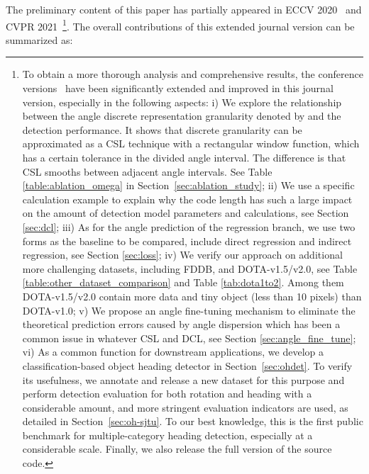 \documentclass[10pt,journal,compsoc]{IEEEtran}
\begin{document}
The preliminary content of this paper has partially appeared in ECCV 2020~\cite{yang2020arbitrary} and CVPR 2021~\cite{yang2021dense}\footnote{To obtain a more thorough analysis and comprehensive results, the conference versions~\cite{yang2020arbitrary, yang2021dense} have been significantly extended and improved in this journal version, especially in the following aspects: 
i) We explore the relationship between the angle discrete representation granularity denoted by  and the detection performance. It shows that discrete granularity  can be approximated as a CSL technique with a rectangular window function, which has a certain tolerance in the divided angle interval. The difference is that CSL smooths between adjacent angle intervals. See Table \ref{table:ablation_omega} in Section~\ref{sec:ablation_study}; ii) We use a specific calculation example to explain why the code length has such a large impact on the amount of detection model parameters and calculations, see Section \ref{sec:dcl}; 
iii) As for the angle prediction of the regression branch, we use two forms as the baseline to be compared, include direct regression and indirect regression, see Section \ref{sec:loss}; 
iv) We verify our approach on additional more challenging datasets, including FDDB, and DOTA-v1.5/v2.0, see Table \ref{table:other_dataset_comparison} and Table \ref{tab:dota1to2}. Among them DOTA-v1.5/v2.0 contain more data and tiny object (less than 10 pixels) than DOTA-v1.0;
v) We propose an angle fine-tuning mechanism to eliminate the theoretical prediction errors caused by angle dispersion which has been a common issue in whatever CSL and DCL, see Section \ref{sec:angle_fine_tune}; 
vi) As a common function for downstream applications, we develop a classification-based object heading detector in Section~\ref{sec:ohdet}. To verify its usefulness, we annotate and release a new dataset for this purpose and perform detection evaluation for both rotation and heading with a considerable amount, and more stringent evaluation indicators are used, as detailed in Section~\ref{sec:oh-sjtu}. To our best knowledge, this is the first public benchmark for multiple-category heading detection, especially at a considerable scale. Finally, we also release the full version of the source code.}. 
The overall contributions of this extended journal version can be summarized as:
\end{document}

